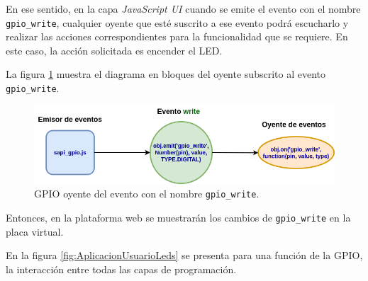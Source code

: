En ese sentido, en la capa \textit{JavaScript UI}  cuando se emite el evento con el nombre \texttt{gpio\_write}, cualquier oyente que esté suscrito a ese evento podrá escucharlo y realizar las acciones correspondientes para la funcionalidad que se requiere. En este caso, la acción solicitada es encender el LED.

La figura \ref{fig:ListeningGPIOEventEmitter} muestra el diagrama en bloques del oyente subscrito al evento \texttt{gpio\_write}.


\begin{figure}[ht]
	\centering
	\includegraphics[scale=.50]{./Figures/ListeningGPIOEventEmitter.png}
	\caption{GPIO oyente del evento con el nombre \texttt{gpio\_write}.}
	\label{fig:ListeningGPIOEventEmitter}
\end{figure}

Entonces, en la plataforma web se muestrarán los cambios de \texttt{gpio\_write} en la placa virtual. 

En la figura \ref{fig:AplicacionUsuarioLeds} se presenta para una función de la GPIO, la interacción entre todas las capas de programación.


